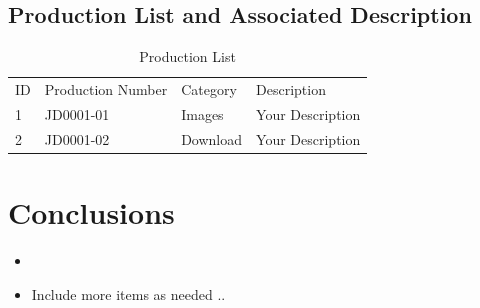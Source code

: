 \documentclass[a4paper,12pt]{article}
\begin{document}
\subsection{Production List and Associated Description}
\label{sec:production_list}
\begin{table}[H]
  \small
  \begin{tabular}{lllp{7cm}}
  \cline{2-4}
  ID & Production Number & Category             & Description          \\ \cline{2-4} 
  1  & JD0001-01         & Images               &  Your Description                 \\
  2  & JD0001-02         & Download  & Your Description \\  \cmidrule(l){2-4}                                                                                                                
  \end{tabular}
  \caption{Production List}
  \label{tab:production_list}
  \end{table}
\section{Conclusions}
\lipsum[66]
\begin{itemize}
  \item \lipsum[66]
  \item Include more items as needed ..
\end{itemize}
\lipsum

\clearpage

\printglossary
\clearpage

\appendix
\appendixpage
\addappheadtotoc

\end{document}
